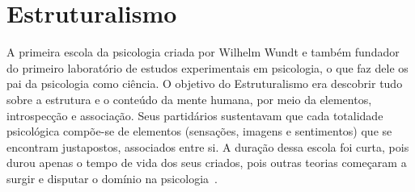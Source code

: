 \newpage
\section{Estruturalismo}\label{estruturalismo}

A primeira escola da psicologia criada por Wilhelm Wundt e também fundador do primeiro laboratório de estudos experimentais em psicologia, o que faz dele os pai da psicologia como ciência. 
O objetivo do Estruturalismo era descobrir tudo sobre a estrutura e o conteúdo da mente humana, por meio da elementos, introspecção e associação.
Seus partidários sustentavam que cada totalidade psicológica compõe-se de elementos (sensações, imagens e sentimentos) que se encontram justapostos, associados entre si.
A duração dessa escola foi curta, pois durou apenas o tempo de vida dos seus criados, pois outras teorias começaram a surgir e disputar o domínio na psicologia~\cite{silva2007psicologia_educacao}.  
